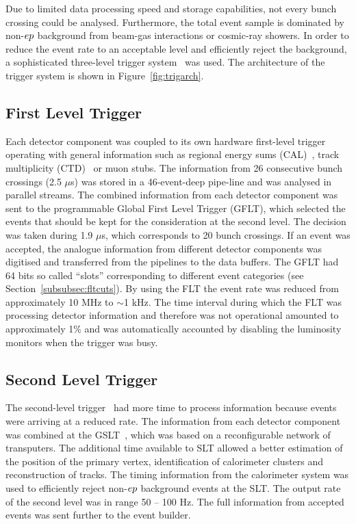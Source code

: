 Due to limited data processing speed and storage capabilities, not every bunch crossing could be analysed. Furthermore, the total event sample is dominated by non-$\mbox{$e p$}$ background from beam-gas interactions or cosmic-ray showers. In order to reduce the event rate to an acceptable level and efficiently reject the background, a sophisticated three-level trigger system~\cite{Smith:1992im,nim:a379:542,Carlin:1995rv} was used. The architecture of the \zeus trigger system is shown in Figure~\ref{fig:trigarch}. 

\subsection{First Level Trigger}
\label{subsec:flt} Each detector component was coupled to its own hardware first-level trigger operating with general information such as regional energy sums (CAL)~\cite{nim:a355:278}, track multiplicity (CTD)~\cite{nim:a315:431} or muon stubs. The information from 26 consecutive bunch crossings (2.5 $\mu$s) was stored in a 46-event-deep pipe-line and was analysed in parallel streams. The combined information from each detector component was sent to the programmable Global First Level Trigger (GFLT), which selected the events that should be kept for the consideration at the second level. The decision was taken during 1.9 $\mu$s, which corresponds to 20 bunch crossings. If an event was accepted, the analogue information from different detector components was digitised and transferred from the pipelines to the data buffers. The GFLT had 64 bits so called ``slots'' corresponding to different event categories (see Section~\ref{subsubsec:fltcuts}). By using the FLT the event rate was reduced from approximately 10 MHz to $\sim$1 kHz. The time interval during which the FLT was processing detector information and therefore was not operational amounted to approximately 1\% and was automatically accounted by disabling the luminosity monitors when the trigger was busy.

\subsection{Second Level Trigger}
\label{subsec:slt}
The second-level trigger~\cite{Allfrey:2007zz} had more time to process information because events were arriving at a reduced rate. The information from each detector component was combined at the GSLT~\cite{upub:abbiendi:zn99063,upub:chlebana:zn94102,Uijterwaal:1992xc}, which was based on a reconfigurable network of transputers. The additional time available to SLT allowed a better estimation of the position of the primary vertex, identification of  calorimeter clusters and reconstruction of tracks. The timing information from the calorimeter system was used to efficiently reject non-$\mbox{$e p$}$ background events at the SLT. The output rate of the second level was in range 50 -- 100 Hz. The full information from accepted events was sent further to the event builder.

